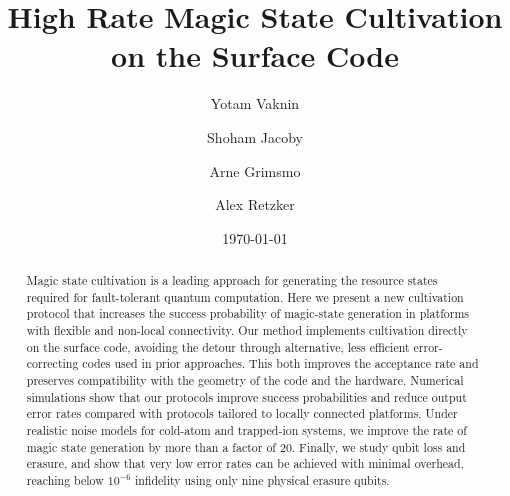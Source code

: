 \documentclass[twocolumn,notitlepage,nofootinbib,floatfix,superscriptaddress]{revtex4-1}
\begin{document}

\title{High Rate Magic State Cultivation on the Surface Code}%

\author{Yotam Vaknin}
\author{Shoham Jacoby}

 \author{Arne Grimsmo}
\author{Alex Retzker}


\date{\today}%

\begin{abstract}

Magic state cultivation is a leading approach for generating the resource states required for fault-tolerant quantum computation. Here we present a new cultivation protocol that increases the success probability of magic-state generation in platforms with flexible and non-local connectivity. Our method implements cultivation directly on the surface code, avoiding the detour through alternative, less efficient error-correcting codes used in prior approaches. This both improves the acceptance rate and preserves compatibility with the geometry of the code and the hardware. Numerical simulations show that our protocols improve success probabilities and reduce output error rates compared with protocols tailored to locally connected platforms. Under realistic noise models for cold-atom and trapped-ion systems, we improve the rate of magic state generation by more than a factor of $20$. Finally, we study qubit loss and erasure, and show that very low error rates can be achieved with minimal overhead, reaching below $10^{-6}$ infidelity using only nine physical erasure qubits.
\end{abstract}
\maketitle
\end{document}
